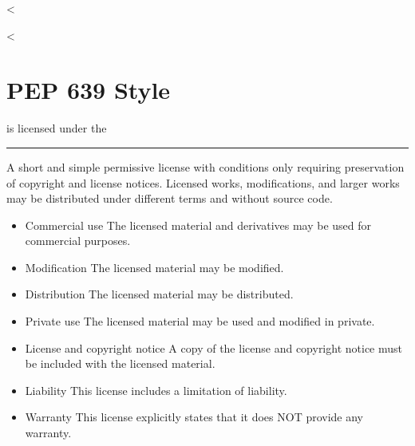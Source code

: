 \documentclass[letterpaper,10pt,english]{sphinxmanual}
\begin{document}
<%
\sphinxstepscope

<%
\chapter{PEP 639 Style}
\label{\detokenize{examples/pep639:pep-639-style}}\label{\detokenize{examples/pep639::doc}}
 is licensed under the 



\bigskip\hrule\bigskip



A short and simple permissive license with conditions only requiring preservation of copyright and license notices. Licensed works, modifications, and larger works may be distributed under different terms and without source code.

\vspace{10px}

\begin{itemize}
\item {}
Commercial use \textendash{} The licensed material and derivatives may be used for commercial purposes.

\item {}
Modification \textendash{} The licensed material may be modified.

\item {}
Distribution \textendash{} The licensed material may be distributed.

\item {}
Private use \textendash{} The licensed material may be used and modified in private.

\end{itemize}

\vspace{10px}

\begin{itemize}
\item {}
License and copyright notice \textendash{} A copy of the license and copyright notice must be included with the licensed material.

\end{itemize}

\vspace{10px}

\begin{itemize}
\item {}
Liability \textendash{} This license includes a limitation of liability.

\item {}
Warranty \textendash{} This license explicitly states that it does NOT provide any warranty.

\end{itemize}
\end{document}
